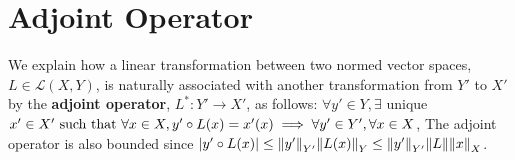 \section{Adjoint Operator}
We explain how a linear transformation between two normed vector spaces, $L\in\mathcal{L}(X,Y)$, is naturally associated with another transformation from $Y'$ to $X'$ by the \textbf{adjoint operator}, $L^*:Y'\rightarrow X'$, as follows: $\forall y'\in Y,\exists$ unique $x'\in X'\text{ such that } \forall x\in X, y'\circ L(x) = x'(x) \implies \forall y'\in Y',\forall x\in X$,
The adjoint operator is also bounded since $\abs{y'\circ L (x)}\leq \norm{y'}_{Y'}\norm{L(x)}_Y\leq \norm{y'}_{Y'}\norm{L}\norm{x}_{X}$.

